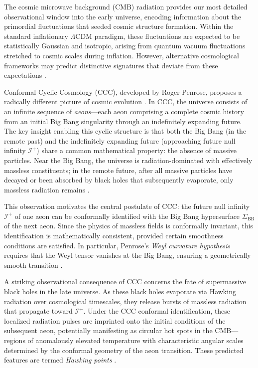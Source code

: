 \documentclass[11pt,a4paper]{article}
\theoremstyle{plain}
\theoremstyle{definition}
\theoremstyle{remark}
\newcommand{\scriplus}{\mathcal{I}^+}
\newcommand{\sigmabb}{\Sigma_{\mathrm{BB}}}
\begin{document}
The cosmic microwave background (CMB) radiation provides our most detailed observational window into the early universe, encoding information about the primordial fluctuations that seeded cosmic structure formation. Within the standard inflationary $\Lambda$CDM paradigm, these fluctuations are expected to be statistically Gaussian and isotropic, arising from quantum vacuum fluctuations stretched to cosmic scales during inflation. However, alternative cosmological frameworks may predict distinctive signatures that deviate from these expectations \cite{ccc_wiki}.

Conformal Cyclic Cosmology (CCC), developed by Roger Penrose, proposes a radically different picture of cosmic evolution \cite{penrose_cycles}. In CCC, the universe consists of an infinite sequence of \emph{aeons}---each aeon comprising a complete cosmic history from an initial Big Bang singularity through an indefinitely expanding future. The key insight enabling this cyclic structure is that both the Big Bang (in the remote past) and the indefinitely expanding future (approaching future null infinity $\scriplus$) share a common mathematical property: the absence of massive particles. Near the Big Bang, the universe is radiation-dominated with effectively massless constituents; in the remote future, after all massive particles have decayed or been absorbed by black holes that subsequently evaporate, only massless radiation remains \cite{oxford_math}.

This observation motivates the central postulate of CCC: the future null infinity $\scriplus$ of one aeon can be conformally identified with the Big Bang hypersurface $\sigmabb$ of the next aeon. Since the physics of massless fields is conformally invariant, this identification is mathematically consistent, provided certain smoothness conditions are satisfied. In particular, Penrose's \emph{Weyl curvature hypothesis} requires that the Weyl tensor vanishes at the Big Bang, ensuring a geometrically smooth transition \cite{penrose_weyl}.

A striking observational consequence of CCC concerns the fate of supermassive black holes in the late universe. As these black holes evaporate via Hawking radiation over cosmological timescales, they release bursts of massless radiation that propagate toward $\scriplus$. Under the CCC conformal identification, these localized radiation pulses are imprinted onto the initial conditions of the subsequent aeon, potentially manifesting as circular hot spots in the CMB---regions of anomalously elevated temperature with characteristic angular scales determined by the conformal geometry of the aeon transition. These predicted features are termed \emph{Hawking points} \cite{hawking_points_2020}.
\end{document}
